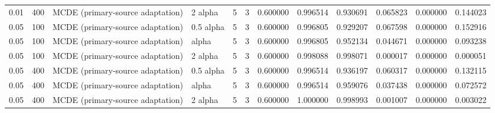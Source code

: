 \begin{tabular}{llllllllllll}
0.01 & 400 & MCDE (primary-source adaptation) & 2 alpha & 5 & 3 & 0.600000 & 0.996514 & 0.930691 & 0.065823 & 0.000000 & 0.144023 \\
0.05 & 100 & MCDE (primary-source adaptation) & 0.5 alpha & 5 & 3 & 0.600000 & 0.996805 & 0.929207 & 0.067598 & 0.000000 & 0.152916 \\
0.05 & 100 & MCDE (primary-source adaptation) & alpha & 5 & 3 & 0.600000 & 0.996805 & 0.952134 & 0.044671 & 0.000000 & 0.093238 \\
0.05 & 100 & MCDE (primary-source adaptation) & 2 alpha & 5 & 3 & 0.600000 & 0.998088 & 0.998071 & 0.000017 & 0.000000 & 0.000051 \\
0.05 & 400 & MCDE (primary-source adaptation) & 0.5 alpha & 5 & 3 & 0.600000 & 0.996514 & 0.936197 & 0.060317 & 0.000000 & 0.132115 \\
0.05 & 400 & MCDE (primary-source adaptation) & alpha & 5 & 3 & 0.600000 & 0.996514 & 0.959076 & 0.037438 & 0.000000 & 0.072572 \\
0.05 & 400 & MCDE (primary-source adaptation) & 2 alpha & 5 & 3 & 0.600000 & 1.000000 & 0.998993 & 0.001007 & 0.000000 & 0.003022 \\
\bottomrule
\end{tabular}
